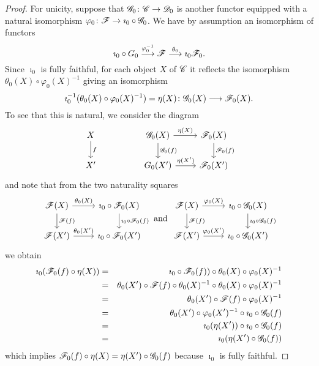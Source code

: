 \documentclass[10pt]{amsart}
\begin{document}
\begin{lem}
\begin{proof}
    For unicity, suppose that $\mathscr{G}_0 \colon \mathscr{C} \to \mathscr{D}_0$ is another functor equipped with a natural isomorphism $\varphi_0 \colon \mathscr{F} \to \imath_0 \circ \mathscr{G}_0$.
    We have by assumption an isomorphism of functors
    $$\imath_0 \circ G_0 \overset{\varphi_0^{-1}}\longrightarrow \mathscr{F} \overset{\theta_0}\longrightarrow \imath_0 \mathscr{F}_0.$$
    Since $\imath_0$ is fully faithful, for each object $X$ of $\mathscr{C}$ it reflects the isomorphism $\theta_0(X) \circ \varphi_0(X)^{-1}$ giving an isomorphism 
    $$\imath_0^{-1}(\theta_0(X) \circ \varphi_0(X)^{-1}) = \eta(X) \colon \mathscr{G}_0(X) \longrightarrow \mathscr{F}_0(X).$$
    To see that this is natural, we consider the diagram
    $$\begin{tikzcd}
      X\arrow{d}{f} & & \G_0(X) \arrow{d}{\G_0(f)}\arrow{r}{\eta(X)} & \F_0(X)\arrow{d}{\F_0(f)}\\
      X^\prime & & G_0(X^\prime) \arrow{r}{\eta(X^\prime)} & \F_0(X^\prime)
    \end{tikzcd}$$
    and note that from the two naturality squares
    $$\begin{tikzcd}
      \F(X) \arrow{d}{\F(f)}\arrow{r}{\theta_0(X)} & \imath_0 \circ \F_0(X)\arrow{d}{\imath_0 \circ \F_0(f)}\\
      \F(X^\prime) \arrow{r}{\theta_0(X^\prime)} & \imath_0 \circ \F_0(X^\prime)
    \end{tikzcd}
    \ \text{and}\ 
    \begin{tikzcd}
      \F(X) \arrow{d}{\F(f)}\arrow{r}{\varphi_0(X)} & \imath_0 \circ \G_0(X)\arrow{d}{\imath_0 \circ \G_0(f)}\\
      \F(X^\prime) \arrow{r}{\varphi_0(X^\prime)} & \imath_0 \circ \G_0(X^\prime)
    \end{tikzcd}$$
    we obtain
    \begin{eqnarray*}
      \imath_0(\mathscr{F}_0(f) \circ \eta(X)) &=& \imath_0 \circ \mathscr{F}_0(f)) \circ \theta_0(X) \circ \varphi_0(X)^{-1}\\
      &=& \theta_0(X^\prime) \circ \mathscr{F}(f) \circ \theta_0(X)^{-1} \circ \theta_0(X) \circ \varphi_0(X)^{-1}\\
      &=& \theta_0(X^\prime) \circ \mathscr{F}(f) \circ \varphi_0(X)^{-1}\\
      &=& \theta_0(X^\prime) \circ \varphi_0(X^\prime)^{-1} \circ \imath_0 \circ \mathscr{G}_0(f)\\
      &=& \imath_0(\eta(X^\prime)) \circ \imath_0 \circ \mathscr{G}_0(f)\\
      &=& \imath_0(\eta(X^\prime) \circ \mathscr{G}_0(f))
    \end{eqnarray*}
    which implies $\mathscr{F}_0(f) \circ \eta(X) = \eta(X^\prime) \circ \mathscr{G}_0(f)$ because $\imath_0$ is fully faithful.
  \end{proof}
\end{lem}
\end{document}
